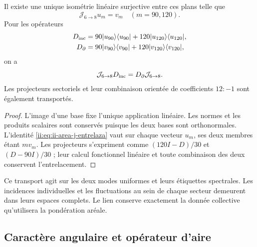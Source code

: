 \begin{theorem}
\label{ii:thm:ii-area-entrelazamiento-colectivo}
Il existe une unique isométrie linéaire surjective entre ces plans telle que
\begin{equation}
 \mathcal J_{6\to8}u_m=v_m\quad(m=90,120).
 \label{ii:eq:ii-area-j-colectivo}
\end{equation}
Pour les opérateurs
\[
 \begin{aligned}
 D_{\rm inc}&=90|u_{90}\rangle\langle u_{90}|
             +120|u_{120}\rangle\langle u_{120}|,\\
 D_\partial&=90|v_{90}\rangle\langle v_{90}|
             +120|v_{120}\rangle\langle v_{120}|,
 \end{aligned}
\]
on a
\begin{equation}
 \mathcal J_{6\to8}D_{\rm inc}
 =D_\partial\mathcal J_{6\to8}.
 \label{ii:eq:ii-area-j-entrelaza}
\end{equation}
Les projecteurs sectoriels et leur combinaison orientée de coefficients
\(12:-1\) sont également transportés.
\end{theorem}
\begin{proof}
L'image d'une base fixe l'unique application linéaire. Les normes et les
produits scalaires sont conservés puisque les deux bases sont orthonormales.
L'identité \eqref{ii:eq:ii-area-j-entrelaza} vaut sur chaque vecteur
\(u_m\), ses deux membres étant \(m v_m\). Les projecteurs
s'expriment comme \((120I-D)/30\) et \((D-90I)/30\) ; leur calcul fonctionnel
linéaire et toute combinaison des deux conservent l'entrelacement.
\end{proof}

Ce transport agit sur les deux modes uniformes et leurs étiquettes
spectrales. Les incidences individuelles et les fluctuations au sein de
chaque secteur demeurent dans leurs espaces complets. Le lien conserve
exactement la donnée collective qu'utilisera la pondération aréale.

\subsection{Caractère angulaire et opérateur d'aire}
\label{ii:sec:ii-area-caracter}

